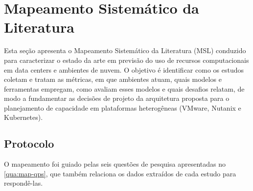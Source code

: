 
\section{Mapeamento Sistemático da Literatura}
\label{sec:mapeamento}

Esta seção apresenta o Mapeamento Sistemático da Literatura (MSL) conduzido para caracterizar o estado da arte em previsão do uso de recursos computacionais em data centers e ambientes de nuvem. O objetivo é identificar como os estudos coletam e tratam as métricas, em que ambientes atuam, quais modelos e ferramentas empregam, como avaliam esses modelos e quais desafios relatam, de modo a fundamentar as decisões de projeto da arquitetura proposta para o planejamento de capacidade em plataformas heterogêneas (VMware, Nutanix e Kubernetes).

\subsection{Protocolo}
\label{subsec:map-protocolo}

O mapeamento foi guiado pelas seis questões de pesquisa apresentadas no \autoref{qua:map-qps}, que também relaciona os dados extraídos de cada estudo para respondê-las.

